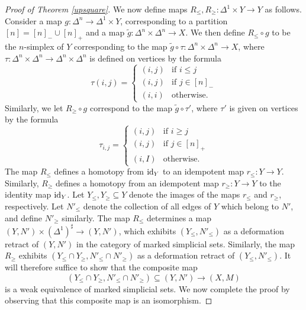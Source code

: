 \begin{proof}[Proof of Theorem \ref{upsquare}]
We now define maps $R_{\leq}, R_{\geq}: \Delta^1 \times Y \rightarrow Y$ as follows.
Consider a map $g: \Delta^n \rightarrow \Delta^1 \times Y$, corresponding to a partition
$[n] = [n]_{-} \cup [n]_{+}$ and a map $\widetilde{g}: \Delta^n \times \Delta^n \rightarrow X$.
We then define $R_{\leq} \circ g$ to be the $n$-simplex of $Y$ corresponding to the map
$\widetilde{g} \circ \tau: \Delta^n \times \Delta^n \rightarrow X$, where
$\tau: \Delta^n \times \Delta^n \rightarrow \Delta^n \times \Delta^n$ is defined on vertices by the formula
$$ \tau(i,j) = \begin{cases} (i,j) & \text{if } i \leq j \\
(i,j) & \text{if } j \in [n]_{-} \\
(i,i) & \text{otherwise.} \end{cases}$$
Similarly, we let $R_{\geq} \circ g$ correspond to the map $\widetilde{g} \circ \tau'$, where
$\tau'$ is given on vertices by the formula
$$ \tau_{i,j} = \begin{cases} (i,j) & \text{if } i \geq j \\
(i,j) & \text{if } j \in [n]_{+} \\
(i,I) & \text{otherwise.} \end{cases}$$
The map $R_{\leq}$ defines a homotopy from $\operatorname{id}_{Y}$ to an idempotent map
$r_{\leq}: Y \rightarrow Y$. Similarly, $R_{\geq}$ defines a homotopy from an idempotent map
$r_{\geq}: Y \rightarrow Y$ to the identity map $\operatorname{id}_{Y}$. Let $Y_{\leq}, Y_{\geq} \subseteq Y$
denote the images of the maps $r_{\leq}$ and $r_{\geq}$, respectively. Let
$N'_{\leq}$ denote the collection of all edges of $Y$ which belong to $N'$, and define
$N'_{\geq}$ similarly. The map $R_{\leq}$ determines a map
$(Y,N') \times (\Delta^1)^{\sharp} \rightarrow (Y,N')$, which exhibits
$(Y_{\leq}, N'_{\leq})$ as a deformation retract of $(Y, N')$ in the category of marked simplicial sets.
Similarly, the map $R_{\geq}$ exhibits $(Y_{\leq} \cap Y_{\geq}, N'_{\leq} \cap N'_{\geq})$ as a
deformation retract of $(Y_{\leq}, N'_{\leq})$. It will therefore suffice to show that the composite map
$$ (Y_{\leq} \cap Y_{\geq}, N'_{\leq} \cap N'_{\geq}) \subseteq (Y, N') \rightarrow (X,M)$$
is a weak equivalence of marked simplicial sets. We now complete the proof by observing that this composite map is an isomorphism.
\end{proof}


